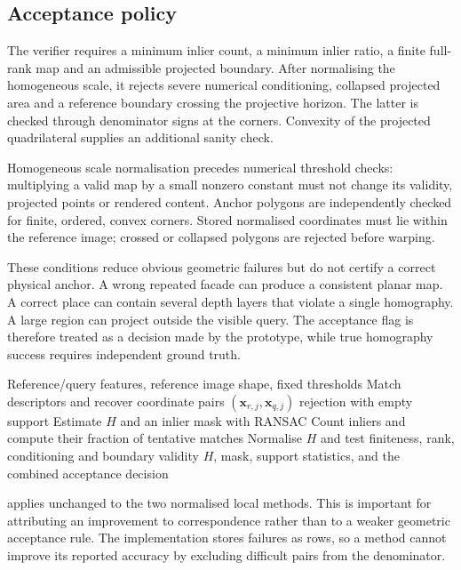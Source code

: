 \subsection{Acceptance policy}
The verifier requires a minimum inlier count, a minimum inlier ratio, a finite full-rank map and an admissible projected boundary. After normalising the homogeneous scale, it rejects severe numerical conditioning, collapsed projected area and a reference boundary crossing the projective horizon. The latter is checked through denominator signs at the corners. Convexity of the projected quadrilateral supplies an additional sanity check.

Homogeneous scale normalisation precedes numerical threshold checks: multiplying a valid map by a small nonzero constant must not change its validity, projected points or rendered content. Anchor polygons are independently checked for finite, ordered, convex corners. Stored normalised coordinates must lie within the reference image; crossed or collapsed polygons are rejected before warping.

These conditions reduce obvious geometric failures but do not certify a correct physical anchor. A wrong repeated facade can produce a consistent planar map. A correct place can contain several depth layers that violate a single homography. A large region can project outside the visible query. The acceptance flag is therefore treated as a decision made by the prototype, while true homography success requires independent ground truth.

\begin{algorithm}[htbp]
\caption{Shared local verification}\label{alg:verification}
\begin{algorithmic}[1]
\Require Reference/query features, reference image shape, fixed thresholds
\State Match descriptors and recover coordinate pairs $(\mathbf x_{r,j},\mathbf x_{q,j})$
\State \Return rejection with empty support
\EndIf
\State Estimate $H$ and an inlier mask with RANSAC
\State Count inliers and compute their fraction of tentative matches
\State Normalise $H$ and test finiteness, rank, conditioning and boundary validity
\State \Return $H$, mask, support statistics, and the combined acceptance decision
\end{algorithmic}
\end{algorithm}

 applies unchanged to the two normalised local methods. This is important for attributing an improvement to correspondence rather than to a weaker geometric acceptance rule. The implementation stores failures as rows, so a method cannot improve its reported accuracy by excluding difficult pairs from the denominator.


